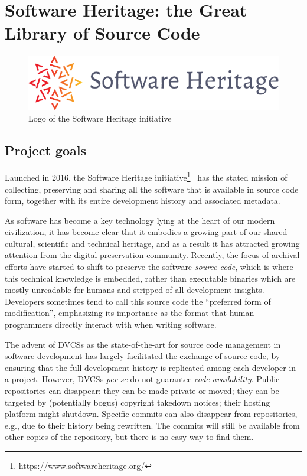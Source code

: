 \chapter{Software Heritage: the Great Library of Source Code}%
\label{chp:software-heritage}

\begin{figure}
    \centering
    \includegraphics[width=0.5\linewidth]{img/SWH-logo}
    \caption{Logo of the Software Heritage initiative}
\end{figure}

\section{Project goals}

Launched in 2016, the Software Heritage
initiative\footnote{\url{https://www.softwareheritage.org/}}~\cite{swhcacm2018}
has the stated mission of collecting, preserving and sharing all the software
that is available in source code form, together with its entire development
history and associated metadata.

As software has become a key technology lying at the heart of our modern
civilization, it has become clear that it embodies a growing part of our shared
cultural, scientific and technical heritage, and as a result it has attracted
growing attention from the digital preservation community.
Recently, the focus of archival efforts have started to shift to preserve the
software \emph{source code}, which is where this technical knowledge is
embedded, rather than executable binaries which are mostly unreadable for
humans and stripped of all development insights. Developers sometimes tend to
call this source code the ``preferred form of modification'', emphasizing its
importance as the format that human programmers directly interact with when
writing software.

The advent of \glspl{DVCS} as the state-of-the-art for source code management
in software development has largely facilitated the exchange of source code,
by ensuring that the full development history is replicated among each
developer in a project. However, \glspl{DVCS} \emph{per se} do not guarantee
\emph{code availability}. Public repositories can disappear: they can be made
private or moved; they can be targeted by (potentially bogus) copyright
takedown notices; their hosting platform might shutdown. Specific commits can
also disappear from repositories, e.g., due to their history being rewritten.
The commits will still be available from other copies of the repository, but
there is no easy way to find them.

